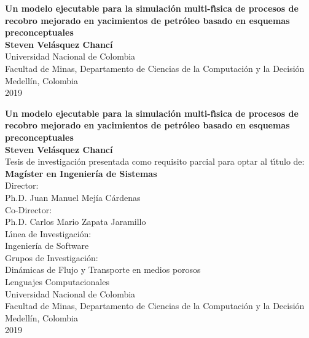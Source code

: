 \begin{center}
\begin{figure}
\centering%
%
\end{figure}
\thispagestyle{empty} \vspace*{0.0cm} \textbf{\LARGE
Un modelo ejecutable para la simulación multi-f\'{\i}sica de procesos de recobro mejorado en yacimientos de petr\'{o}leo basado en esquemas preconceptuales}\\[5.3cm]
\Large\textbf{Steven Velásquez Chancí}\\[5.3cm]
\small Universidad Nacional de Colombia\\
Facultad de Minas, Departamento de Ciencias de la Computación y la Decisión\\
Medellín, Colombia\\
2019\\
\end{center}

\newpage
\begin{center}
\thispagestyle{empty} \vspace*{0cm} \textbf{\LARGE
Un modelo ejecutable para la simulación multi-f\'{\i}sica de procesos de recobro mejorado en yacimientos de petr\'{o}leo basado en esquemas preconceptuales}\\[2.0cm]
\Large\textbf{Steven Velásquez Chancí}\\[2.0cm]
\small Tesis de investigación presentada como requisito parcial para optar al
t\'{\i}tulo de:\\
\textbf{Magíster en Ingeniería de Sistemas}\\[2.0cm]
Director:\\
Ph.D. Juan Manuel Mejía Cárdenas\\
Co-Director:\\
Ph.D. Carlos Mario Zapata Jaramillo\\[2.0cm]
L\'{\i}nea de Investigaci\'{o}n:\\
Ingeniería de Software\\
Grupos de Investigaci\'{o}n:\\
Dinámicas de Flujo y Transporte en medios porosos\\
Lenguajes Computacionales\\[2.0cm]
Universidad Nacional de Colombia\\
Facultad de Minas, Departamento de Ciencias de la Computación y la Decisión\\
Medellín, Colombia\\
2019\\
\end{center}

